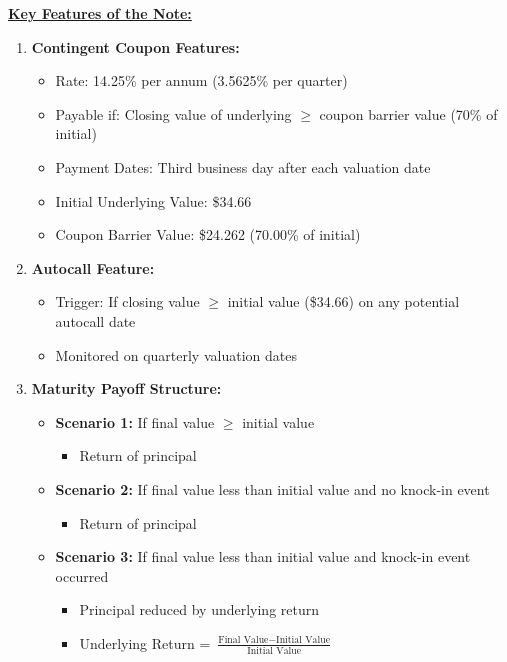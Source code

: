 \documentclass[12pt,a4paper]{article}
\begin{document}
\vspace{0.5cm}

\label{app:characteristics}
\underline{\textbf{Key Features of the Note:}}

\begin{enumerate}

\item \textbf{Contingent Coupon Features:}
    \begin{itemize}
    \item Rate: 14.25\% per annum (3.5625\% per quarter)
    \item Payable if: Closing value of underlying \(\geq\) coupon barrier value (70\% of initial)
    \item Payment Dates: Third business day after each valuation date
    \item Initial Underlying Value: \$34.66
    \item Coupon Barrier Value: \$24.262 (70.00\% of initial)
    \end{itemize}

\item \textbf{Autocall Feature:}
    \begin{itemize}
    \item Trigger: If closing value \(\geq\) initial value (\$34.66) on any potential autocall date
    \item Monitored on quarterly valuation dates
    \end{itemize}

\item \textbf{Maturity Payoff Structure:}
    \begin{itemize}
    \item \textbf{Scenario 1:} If final value \(\geq\) initial value
        \begin{itemize}
        \item Return of principal
        \end{itemize}
    \item \textbf{Scenario 2:} If final value less than initial value and no knock-in event
        \begin{itemize}
        \item Return of principal
        \end{itemize}
    \item \textbf{Scenario 3:} If final value less than  initial value and knock-in event occurred
        \begin{itemize}
        \item Principal reduced by underlying return
        \item Underlying Return = \(\frac{\text{Final Value} - \text{Initial Value}}{\text{Initial Value}}\)
        \end{itemize}
    \end{itemize}


\end{enumerate}
\end{document}
